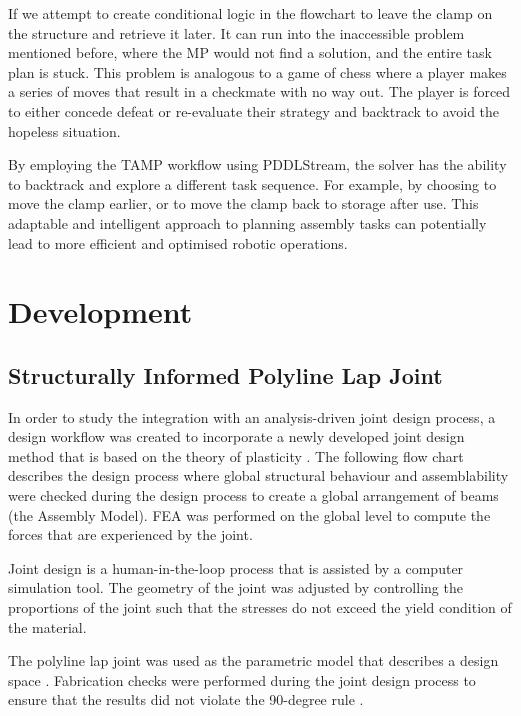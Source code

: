 


If we attempt to create conditional logic in the flowchart to leave the clamp on the structure and retrieve it later. It can run into the inaccessible problem mentioned before, where the MP would not find a solution, and the entire task plan is stuck. This problem is analogous to a game of chess where a player makes a series of moves that result in a checkmate with no way out. The player is forced to either concede defeat or re-evaluate their strategy and backtrack to avoid the hopeless situation.

By employing the TAMP workflow using PDDLStream, the solver has the ability to backtrack and explore a different task sequence. For example, by choosing to move the clamp earlier, or to move the clamp back to storage after use. This adaptable and intelligent approach to planning assembly tasks can potentially lead to more efficient and optimised robotic operations.

\section{Development}
\label{section:exploration-5-development}

\subsection{Structurally Informed Polyline Lap Joint}
\label{subsection:exploration-5-structurally-informed-polyline-lap-joint}

In order to study the integration with an analysis-driven joint design process, a design workflow was created to incorporate a newly developed joint design method that is based on the theory of plasticity \parencite{tanadiniLimitAnalysisTimber2023}. The following flow chart describes the design process where global structural behaviour and assemblability were checked during the design process to create a global arrangement of beams (the Assembly Model). FEA was performed on the global level to compute the forces that are experienced by the joint. 

Joint design is a human-in-the-loop process that is assisted by a computer simulation tool. The geometry of the joint was adjusted by controlling the proportions of the joint such that the stresses do not exceed the yield condition of the material.




The polyline lap joint was used as the parametric model that describes a design space . Fabrication checks were performed during the joint design process to ensure that the results did not violate the 90-degree rule . 

